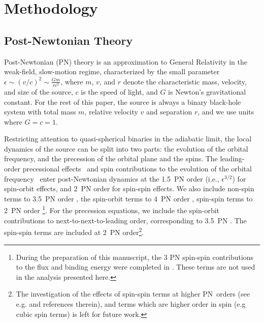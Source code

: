 \documentclass[aps,prd,amsmath,floatfix,twocolumn,superscriptaddress,nofootinbib,showpacs]{revtex4-1}
\begin{document}
\section{Methodology}
\label{sec:Methodology}




\subsection{Post-Newtonian Theory}
\label{sec:PostNewtonianTheory}

Post-Newtonian (PN) theory is an approximation to General Relativity
in the weak-field, slow-motion regime, characterized by the small
parameter $\epsilon \sim (v/c)^{2} \sim \frac{Gm}{rc^2}$, where $m$,
$v$, and $r$ denote the characteristic mass, velocity, and size of the
source, $c$ is the speed of light, and $G$ is Newton's gravitational
constant.  For the rest of this paper, the source is always a binary
black-hole system with total mass $m$, relative velocity $v$ and
separation $r$, and we use units where $G=c=1$.

Restricting attention to quasi-spherical binaries in the
adiabatic limit, the local dynamics of the source can be split into
two parts: the evolution of the orbital frequency, and the precession
of the orbital plane and the spins. The leading-order precessional
effects~\cite{Barker:1975ae} and spin contributions to the evolution
of the orbital frequency~\cite{kidder93,Kidder:1995zr} enter
post-Newtonian dynamics at the 1.5~PN order (i.e., $\epsilon^{3/2}$)
for spin-orbit effects, and 2~PN order for spin-spin effects. We also
include non-spin terms to 3.5~PN order \cite{lrr-2014-2}, the
spin-orbit terms to 4~PN order \cite{Marsat:2013caa}, spin-spin terms
to 2~PN order \cite{Kidder:1995zr}\footnote{ During the
    preparation of this manuscript, the 3 PN spin-spin contributions
    to the flux and binding energy were completed in
    \cite{Bohe:2015ana}. These terms are not used in the analysis
    presented here.}. For the precession equations, we include the
spin-orbit contributions to next-to-next-to-leading order,
corresponding to 3.5~PN \cite{BoheEtAl:2013}. The spin-spin terms are
included at 2~PN order\footnote{The investigation of the
    effects of spin-spin terms at higher PN~orders (see
    e.g. \cite{Hartung:2011ea,PR08a,Levi:2014sba} and references
    therein), and terms which are higher order in spin (e.g cubic spin
    terms) \cite{Marsat:2014xea,Levi:2014gsa} is left for future
    work.}.
\end{document}
